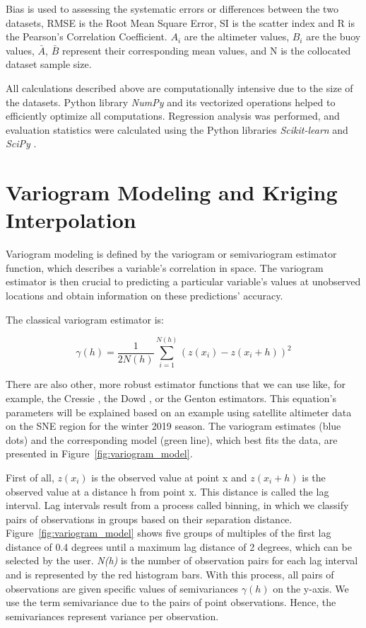 Bias is used to assessing the systematic errors or differences between the two datasets, RMSE is the Root Mean Square Error, SI is the scatter index and R is the Pearson’s Correlation Coefficient. $A_{i}$ are the altimeter values, $B_{i}$ are the buoy values,  $\bar{A}$, $\bar{B}$ represent their corresponding mean values, and  N is the collocated dataset sample size.

All calculations described above are computationally intensive due to the size of the datasets. Python library \emph{NumPy} \cite{Harris2020} and its vectorized operations helped to efficiently optimize all computations. Regression analysis was performed, and evaluation statistics were calculated using the Python libraries \emph{Scikit-learn} and \emph{SciPy}  \cite{Varoquaux2015, Virtanen2020}.




\section{Variogram Modeling and Kriging Interpolation}\label{variogram_kriging}


Variogram modeling is defined by the variogram or semivariogram estimator function, which describes a variable's correlation in space. The variogram estimator is then crucial to predicting a particular variable's values at unobserved locations and obtain information on these predictions' accuracy.

The classical variogram estimator is:


\begin{equation}
\gamma(h) = \frac{1}{2N(h)} \sum^{N(h)}_{i=1} \left(z(x_{i})-z(x_{i}+h) \right)^{2}
\label{eqn:variogram_estimator}
\end{equation}

There are also other, more robust estimator functions that we can use like, for example, the Cressie \cite{Cressie1980}, the Dowd \cite{Dowd1984}, or the Genton \cite{Genton1998} estimators. This equation's parameters will be explained based on an example using satellite altimeter data on the SNE region for the winter 2019 season. The variogram estimates (blue dots) and the corresponding model (green line), which best fits the data, are presented in Figure~\ref{fig:variogram_model}.

First of all, $z(x_{i})$ is the observed value at point x and $z(x_{i}+h)$ is the observed value at a distance h from point x. This distance is called the lag interval. Lag intervals result from a process called binning, in which we classify pairs of observations in groups based on their separation distance. Figure~\ref{fig:variogram_model} shows five groups of multiples of the first lag distance of 0.4 degrees until a maximum lag distance of 2 degrees, which can be selected by the user. \emph{N(h)} is the number of observation pairs for each lag interval and is represented by the red histogram bars. With this process, all pairs of observations are given specific values of semivariances $\gamma(h)$ on the y-axis. We use the term semivariance due to the pairs of point observations. Hence, the semivariances represent variance per observation.


